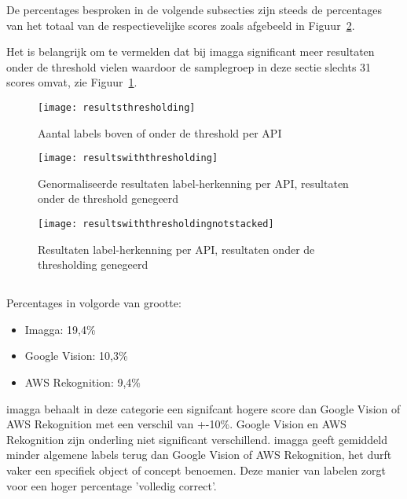 De percentages besproken in de volgende subsecties zijn steeds de percentages van het totaal van de respectievelijke scores zoals afgebeeld in Figuur~\ref{fig:resultswiththresholding}.

Het is belangrijk om te vermelden dat bij imagga significant meer resultaten onder de threshold vielen waardoor de samplegroep in deze sectie slechts 31 scores omvat, zie Figuur~\ref{fig:resultsthresholding}.

\begin{figure}
    \centering    
    \texttt{[image: resultsthresholding]}
    \caption{Aantal labels boven of onder de threshold per API}
    \label{fig:resultsthresholding}
\end{figure}

\begin{figure}
    \centering    
    \texttt{[image: resultswiththresholding]}
    \caption{Genormaliseerde resultaten label-herkenning per API, resultaten onder de threshold genegeerd}
    \label{fig:resultswiththresholding}
\end{figure}

\begin{figure}
    \centering    
    \texttt{[image: resultswiththresholdingnotstacked]}
    \caption{Resultaten label-herkenning per API, resultaten onder de thresholding genegeerd}
    \label{fig:resultswiththresholdingnotstacked}
\end{figure}


\subsection{}
\label{sec:resultaten-volledig-correct}
Percentages in volgorde van grootte:
\begin{itemize}
    \item Imagga: 19,4\%
    \item Google Vision: 10,3\%
    \item AWS Rekognition: 9,4\%
\end{itemize}

imagga behaalt in deze categorie een signifcant hogere score dan Google Vision of AWS Rekognition met een verschil van +-10\%. Google Vision en AWS Rekognition zijn onderling niet significant verschillend.
imagga geeft gemiddeld minder algemene labels terug dan Google Vision of AWS Rekognition, het durft vaker een specifiek object of concept benoemen. Deze manier van labelen zorgt voor een hoger percentage 'volledig correct'.

